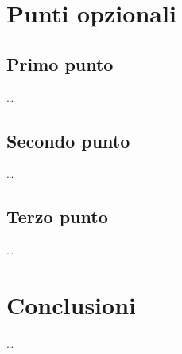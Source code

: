 \documentclass[a4paper, 11pt]{article}
\begin{document}
\section{Punti opzionali}

\subsection{Primo punto}

\dots 

\subsection{Secondo punto}

\dots

\subsection{Terzo punto}

\dots

\section{Conclusioni}

\dots
\end{document}
